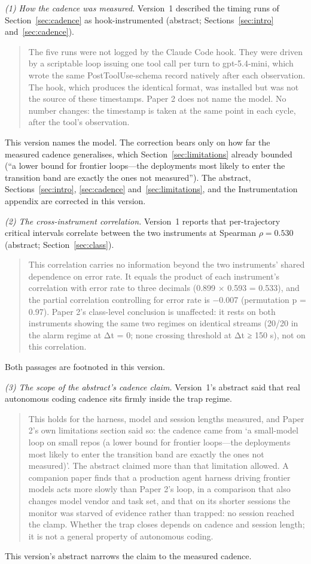 \emph{(1) How the cadence was measured.} Version~1 described the timing runs of
Section~\ref{sec:cadence} as hook-instrumented (abstract;
Sections~\ref{sec:intro} and~\ref{sec:cadence}).
\begin{quote}
The five runs were not logged by the Claude Code hook. They were driven by a scriptable loop issuing one tool call per turn to gpt-5.4-mini, which wrote the same PostToolUse-schema record natively after each observation. The hook, which produces the identical format, was installed but was not the source of these timestamps. Paper 2 does not name the model. No number changes: the timestamp is taken at the same point in each cycle, after the tool's observation.
\end{quote}
This version names the model. The correction bears only on how far the
measured cadence generalises, which Section~\ref{sec:limitations} already
bounded (``a lower bound for frontier loops---the deployments most likely to
enter the transition band are exactly the ones not measured''). The abstract,
Sections~\ref{sec:intro}, \ref{sec:cadence} and~\ref{sec:limitations}, and the
Instrumentation appendix are corrected in this version.

\emph{(2) The cross-instrument correlation.} Version~1 reports that
per-trajectory critical intervals correlate between the two instruments at
Spearman $\rho = 0.530$ (abstract; Section~\ref{sec:class}).
\begin{quote}
This correlation carries no information beyond the two instruments' shared dependence on error rate. It equals the product of each instrument's correlation with error rate to three decimals (0.899 × 0.593 = 0.533), and the partial correlation controlling for error rate is −0.007 (permutation p = 0.97). Paper 2's class-level conclusion is unaffected: it rests on both instruments showing the same two regimes on identical streams (20/20 in the alarm regime at Δt = 0; none crossing threshold at Δt ≥ 150 s), not on this correlation.
\end{quote}
Both passages are footnoted in this version.

\emph{(3) The scope of the abstract's cadence claim.} Version~1's abstract said
that real autonomous coding cadence sits firmly inside the trap regime.
\begin{quote}
This holds for the harness, model and session lengths measured, and Paper 2's own limitations section said so: the cadence came from `a small-model loop on small repos (a lower bound for frontier loops—the deployments most likely to enter the transition band are exactly the ones not measured)'. The abstract claimed more than that limitation allowed. A companion paper finds that a production agent harness driving frontier models acts more slowly than Paper 2's loop, in a comparison that also changes model vendor and task set, and that on its shorter sessions the monitor was starved of evidence rather than trapped: no session reached the clamp. Whether the trap closes depends on cadence and session length; it is not a general property of autonomous coding.
\end{quote}
This version's abstract narrows the claim to the measured cadence.

